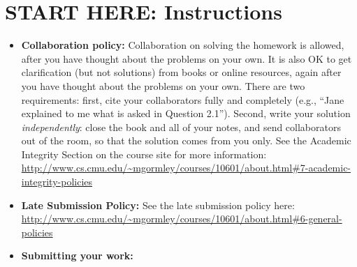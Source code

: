 \documentclass[12pt]{article}
\begin{document}
\section*{START HERE: Instructions}
\begin{itemize}
\item \textbf{Collaboration policy:} Collaboration on solving the homework is allowed, after you have thought about the problems on your own. It is also OK to get clarification (but not solutions) from books or online resources, again after you have thought about the problems on your own. There are two requirements: first, cite your collaborators fully and completely (e.g., ``Jane explained to me what is asked in Question 2.1''). Second, write your solution {\em independently}: close the book and all of your notes, and send collaborators out of the room, so that the solution comes from you only.  See the Academic Integrity Section on the course site for more information: \url{http://www.cs.cmu.edu/~mgormley/courses/10601/about.html#7-academic-integrity-policies}

\item\textbf{Late Submission Policy:} See the late submission policy here: \url{http://www.cs.cmu.edu/~mgormley/courses/10601/about.html#6-general-policies}

\item\textbf{Submitting your work:} 

\begin{itemize}



\end{itemize}
\end{itemize}
\end{document}
